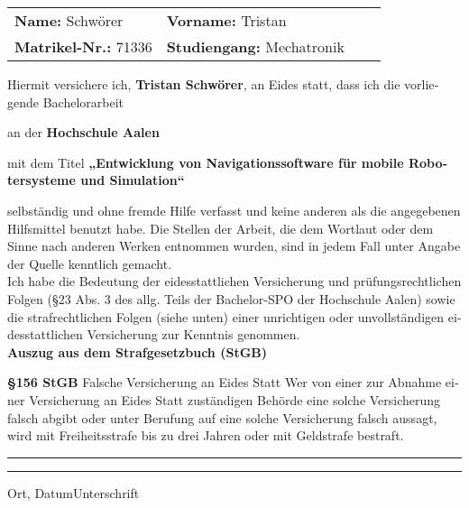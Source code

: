 \begin{otherlanguage}{ngerman}

\vspace*{5mm}

\thispagestyle{empty}

\begin{flushleft}
\begin{tabular}[h]{p{60mm}l p{60mm}l}
\textbf{Name:} Schwörer 			&\textbf{Vorname:} Tristan\\
\textbf{Matrikel-Nr.:} 71336		&\textbf{Studiengang:} Mechatronik\\
\end{tabular}
\end{flushleft}

\vspace*{11mm}

Hiermit versichere ich, \textbf{Tristan Schwörer}, an Eides statt, dass ich die vorliegende Bachelorarbeit

an der \textbf{Hochschule Aalen}

mit dem Titel \textbf{„Entwicklung von Navigationssoftware für mobile Robotersysteme und Simulation“}

selbständig und ohne fremde Hilfe verfasst und keine anderen als die angegebenen Hilfsmittel benutzt habe. Die Stellen der Arbeit, die dem Wortlaut oder dem Sinne nach anderen Werken entnommen wurden, sind in jedem Fall unter Angabe der Quelle kenntlich gemacht.\\

Ich habe die Bedeutung der eidesstattlichen Versicherung und prüfungsrechtlichen Folgen (\S 23 Abs. 3 des allg. Teils der Bachelor-SPO der Hochschule Aalen) sowie die strafrechtlichen Folgen (siehe unten) einer unrichtigen oder unvollständigen eidesstattlichen Versicherung zur Kenntnis genommen.\\

\vspace*{10mm}
\Large\textbf{Auszug aus dem Strafgesetzbuch (StGB)}


\normalsize\textbf{\S 156 StGB} Falsche Versicherung an Eides Statt
Wer von einer zur Abnahme einer Versicherung an Eides Statt zuständigen Behörde eine solche Versicherung falsch abgibt oder unter Berufung auf eine solche Versicherung falsch aussagt, wird mit Freiheitsstrafe bis zu drei Jahren oder mit Geldstrafe bestraft.

\vspace*{25mm}


\rule[-0.2cm]{5cm}{0.5pt} \hspace*{30mm}\rule[-0.2cm]{5cm}{0.5pt}
\newline
Ort, Datum\hspace*{61.85mm}Unterschrift

\end{otherlanguage}